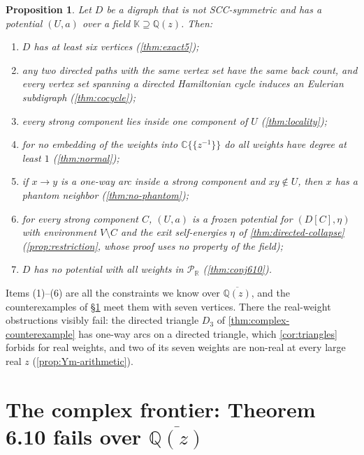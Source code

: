 \documentclass[11pt]{amsart}
\theoremstyle{plain}
\newtheorem{proposition}[theorem]{Proposition}
\theoremstyle{definition}
\theoremstyle{remark}
\numberwithin{equation}{section}
\newcommand{\QQ}{\mathbb{Q}}
\newcommand{\RR}{\mathbb{R}}
\newcommand{\CC}{\mathbb{C}}
\newcommand{\Qz}{\QQ(z)}
\newcommand{\Qzbar}{\overline{\QQ(z)}}
\newcommand{\Puis}{\mathcal{P}_{\RR}}
\begin{document}
\begin{proposition}\label{prop:shape}
Let $D$ be a digraph that is not SCC-symmetric and has a potential $(U,a)$ over a field $\mathbb K\supseteq\Qz$. Then:
\begin{enumerate}[label=\textup{(\arabic*)}]
\item $D$ has at least six vertices \textup{(\cref{thm:exact5})};
\item any two directed paths with the same vertex set have the same back count, and every vertex set spanning a directed Hamiltonian cycle induces an Eulerian subdigraph \textup{(\cref{thm:cocycle})};
\item every strong component lies inside one component of $U$ \textup{(\cref{thm:locality})};
\item for no embedding of the weights into $\CC\{\!\{z^{-1}\}\!\}$ do all weights have degree at least $1$ \textup{(\cref{thm:normal})};
\item if $x\to y$ is a one-way arc inside a strong component and $xy\notin U$, then $x$ has a phantom neighbor \textup{(\cref{thm:no-phantom})};
\item for every strong component $C$, $(U,a)$ is a frozen potential for $(D[C],\eta)$ with environment $V\setminus C$ and the exit self-energies $\eta$ of \cref{thm:directed-collapse} \textup{(\cref{prop:restriction}, whose proof uses no property of the field)};
\item $D$ has no potential with all weights in $\Puis$ \textup{(\cref{thm:conj610})}.
\end{enumerate}
\end{proposition}

Items (1)--(6) are all the constraints we know over $\Qzbar$, and the counterexamples of \S\ref{sec:complex} meet them with seven vertices. There the real-weight obstructions visibly fail: the directed triangle $D_3$ of \cref{thm:complex-counterexample} has one-way arcs on a directed triangle, which \cref{cor:triangles} forbids for real weights, and two of its seven weights are non-real at every large real $z$ (\cref{prop:Ym-arithmetic}).

\section{The complex frontier: Theorem 6.10 fails over \texorpdfstring{$\Qzbar$}{the algebraic closure}}\label{sec:complex}
\end{document}
